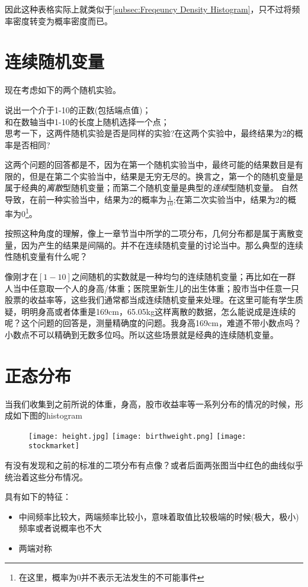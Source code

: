 因此这种表格实际上就类似于\ref{subsec:Freqeuncy Density Histogram}，只不过将频率密度转变为概率密度而已。
\clearpage

\section{连续随机变量}
现在考虑如下的两个随机实验。
\begin{TaskBox}
说出一个介于1-10的正数(包括端点值)；\\和在数轴当中1-10的长度上随机选择一个点；\\
\tcblower
思考一下，这两件随机实验是否是同样的实验?在这两个实验中，最终结果为2的概率是否相同?
\end{TaskBox}

这两个问题的回答都是不，因为在第一个随机实验当中，最终可能的结果数目是有限的，但是在第二个实验当中，结果是无穷无尽的。换言之，第一个的随机变量是属于经典的\emph{离散}型随机变量；而第二个随机变量是典型的\emph{连续}型随机变量。
自然导致，在前一种实验当中，结果为2的概率为$\frac{1}{10}$;在第二次实验当中，结果为2的概率为0\footnote{在这里，概率为0并不表示无法发生的不可能事件}。

按照这种角度的理解，像上一章节当中所学的二项分布，几何分布都是属于离散变量，因为产生的结果是间隔的。并不在连续随机变量的讨论当中。那么典型的连续性随机变量有什么呢？

像刚才在$[1-10]$之间随机的实数就是一种均匀的连续随机变量；再比如在一群人当中任意取一个人的身高/体重；医院里新生儿的出生体重；股市当中任意一只股票的收益率等，这些我们通常都当成连续随机变量来处理。在这里可能有学生质疑，明明身高或者体重是169cm，65.05kg这样离散的数据，怎么能说成是连续的呢？这个问题的回答是，测量精确度的问题。我身高169cm，难道不带小数点吗？小数点不可以精确到无数多位吗。所以这些场景就是经典的连续随机变量。
\clearpage

\section{正态分布}
\label{sec:Normal Distribution}
当我们收集到之前所说的体重，身高，股市收益率等一系列分布的情况的时候，形成如下图的histogram
\begin{figure}[H]
\centering
\texttt{[image: height.jpg]}
\texttt{[image: birthweight.png]}
\texttt{[image: stockmarket]}
\end{figure}
有没有发现和之前的标准的二项分布有点像？或者后面两张图当中红色的曲线似乎统治着这些分布情况。

具有如下的特征：
\begin{itemize}
	\item 中间频率比较大，两端频率比较小，意味着取值比较极端的时候(极大，极小)频率或者说概率也不大
	\item 两端对称
\end{itemize}


